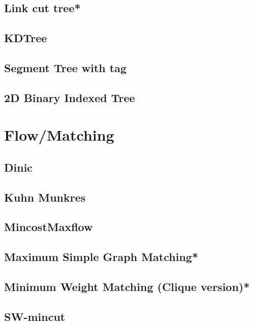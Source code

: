 \subsection{Link cut tree*} %

\subsection{KDTree}

\subsection{Segment Tree with tag}

\subsection{2D Binary Indexed Tree}



\section{Flow/Matching}
\subsection{Dinic}

\subsection{Kuhn Munkres}

\subsection{MincostMaxflow}

\subsection{Maximum Simple Graph Matching*} %

\subsection{Minimum Weight Matching (Clique version)*} %

\subsection{SW-mincut}

